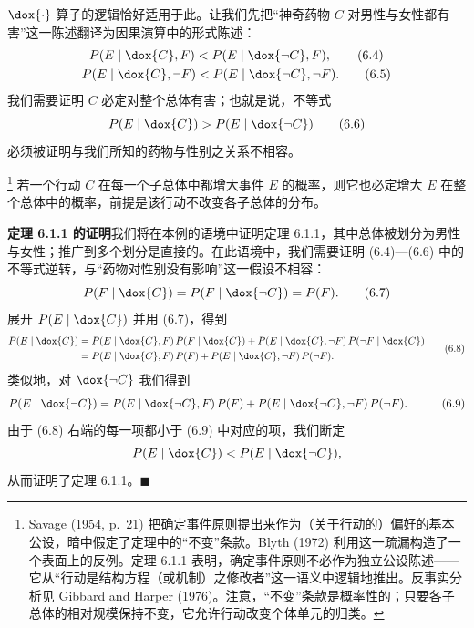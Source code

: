 $\dox{\cdot}$ 算子的逻辑恰好适用于此。让我们先把“神奇药物 $C$ 对男性与女性都有害”这一陈述翻译为因果演算中的形式陈述：
\begin{gather}
P(E\mid \dox{C},F) < P(E\mid \dox{\neg C},F), \tag{6.4}\\
P(E\mid \dox{C},\neg F) < P(E\mid \dox{\neg C},\neg F). \tag{6.5}
\end{gather}
我们需要证明 $C$ 必定对整个总体有害；也就是说，不等式
\begin{equation}
P(E\mid \dox{C}) > P(E\mid \dox{\neg C}) \tag{6.6}
\end{equation}
必须被证明与我们所知的药物与性别之关系不相容。

\begin{theorem}[确定事件原则]\footnote{Savage (1954, p.~21) 把确定事件原则提出来作为（关于行动的）偏好的基本公设，暗中假定了定理中的“不变”条款。Blyth (1972) 利用这一疏漏构造了一个表面上的反例。定理 6.1.1 表明，确定事件原则不必作为独立公设陈述——它从“行动是结构方程（或机制）之修改者”这一语义中逻辑地推出。反事实分析见 Gibbard and Harper (1976)。注意，“不变”条款是概率性的；只要各子总体的相对规模保持不变，它允许行动改变个体单元的归类。}
若一个行动 $C$ 在每一个子总体中都增大事件 $E$ 的概率，则它也必定增大 $E$ 在整个总体中的概率，前提是该行动不改变各子总体的分布。
\end{theorem}

\noindent\textbf{定理 6.1.1 的证明}\quad 我们将在本例的语境中证明定理 6.1.1，其中总体被划分为男性与女性；推广到多个划分是直接的。在此语境中，我们需要证明 \textup{(6.4)}—\textup{(6.6)} 中的不等式逆转，与“药物对性别没有影响”这一假设不相容：
\begin{equation}
P(F\mid \dox{C}) = P(F\mid \dox{\neg C}) = P(F). \tag{6.7}
\end{equation}
展开 $P(E\mid \dox{C})$ 并用 \textup{(6.7)}，得到
\begin{equation}
\begin{aligned}
P(E\mid \dox{C}) &= P(E\mid \dox{C},F)\,P(F\mid \dox{C})
   + P(E\mid \dox{C},\neg F)\,P(\neg F\mid \dox{C})\\
&= P(E\mid \dox{C},F)\,P(F) + P(E\mid \dox{C},\neg F)\,P(\neg F).
\end{aligned} \tag{6.8}
\end{equation}
类似地，对 $\dox{\neg C}$ 我们得到
\begin{equation}
\begin{aligned}
P(E\mid \dox{\neg C}) &= P(E\mid \dox{\neg C},F)\,P(F)
   + P(E\mid \dox{\neg C},\neg F)\,P(\neg F).
\end{aligned} \tag{6.9}
\end{equation}
由于 \textup{(6.8)} 右端的每一项都小于 \textup{(6.9)} 中对应的项，我们断定
\[
P(E\mid \dox{C}) < P(E\mid \dox{\neg C}),
\]
从而证明了定理 6.1.1。$\blacksquare$

